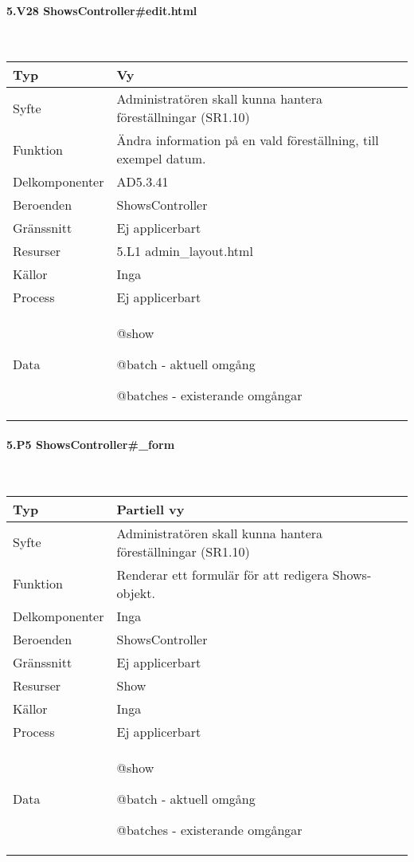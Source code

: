 \documentclass[a4paper, twoside, 11pt, titlepage]{article}
\begin{document}
			\paragraph{5.V28 ShowsController\#edit.html}\

			\begin {table} [ht] \begin{tabular} {  p{3.5cm} p{9.6cm} }
				\hline
				{Typ} & {Vy} \\
				\hline
				{Syfte} & {Administratören skall kunna hantera föreställningar (SR1.10)} \\
				\hline
				{Funktion} & {Ändra information på en vald föreställning, till exempel datum.} \\
				\hline
				{Delkomponenter} & {AD5.3.41} \\
				\hline
				{Beroenden} & {ShowsController} \\
				\hline
				{Gränssnitt} & {Ej applicerbart} \\
				\hline
				{Resurser} & {5.L1 admin\_layout.html} \\
				\hline
				{Källor} & {Inga} \\
				\hline
				{Process} & {Ej applicerbart} \\
				\hline
				{Data} & {@show

@batch - aktuell omgång

@batches - existerande omgångar} \\
				\hline
			\end{tabular} \end{table} \FloatBarrier


			\paragraph{5.P5 ShowsController\#\_form}\

			\begin {table} [ht] \begin{tabular} {  p{3.5cm} p{9.6cm} }
				\hline
				{Typ} & {Partiell vy} \\
				\hline
				{Syfte} & {Administratören skall kunna hantera föreställningar (SR1.10)} \\
				\hline
				{Funktion} & {Renderar ett formulär för att redigera Shows-objekt.} \\
				\hline
				{Delkomponenter} & {Inga} \\
				\hline
				{Beroenden} & {ShowsController} \\
				\hline
				{Gränssnitt} & {Ej applicerbart} \\
				\hline
				{Resurser} & {Show} \\
				\hline
				{Källor} & {Inga} \\
				\hline
				{Process} & {Ej applicerbart} \\
				\hline
				{Data} & {@show

@batch - aktuell omgång

@batches - existerande omgångar} \\
				\hline
			\end{tabular} \end{table} \FloatBarrier
\end{document}
